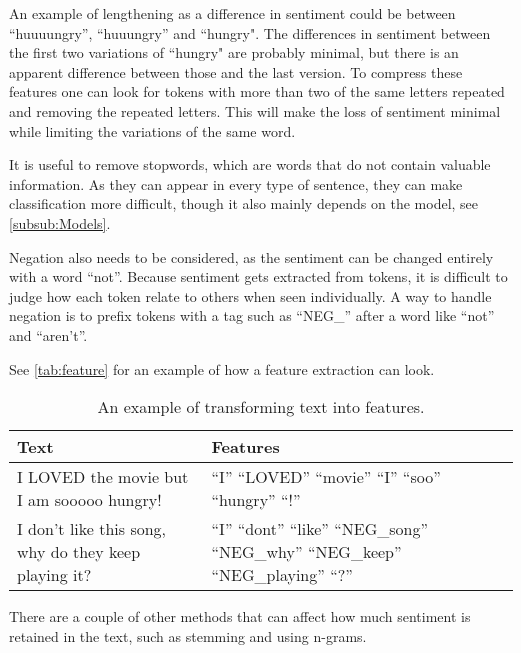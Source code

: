 An example of lengthening as a difference in sentiment could be between
``huuuungry'', ``huuungry'' and ``hungry". The differences in sentiment between
the first two variations of ``hungry" are probably minimal, but there is an
apparent difference between those and the last version. To compress these
features one can look for tokens with more than two of the same letters repeated
and removing the repeated letters. This will make the loss of sentiment minimal
while limiting the variations of the same word.\nl

It is useful to remove stopwords, which are words that do not contain valuable
information. As they can appear in every type of sentence, they can make
classification more difficult, though it also mainly depends on the model,
see \autoref{subsub:Models}.\nl

Negation also needs to be considered, as the sentiment can be changed entirely
with a word ``not''. Because sentiment gets extracted from tokens, it is
difficult to judge how each token relate to others when seen individually. A way
to handle negation is to prefix tokens with a tag such as ``NEG\_'' after a word
like ``not'' and ``aren't''.\nl

See \autoref{tab:feature} for an example of how a feature extraction can look.

\begin{table}[H]
\centering
\begin{tabular}{|p{6cm}|p{8cm}|}
\hline
Text & Features \\ \hline
I LOVED the movie but I am sooooo hungry! & 
``I'' ``LOVED'' ``movie'' ``I'' ``soo'' ``hungry'' ``!''
\\ \hline 
I don't like this song, why do they keep playing it? &
``I'' ``dont'' ``like'' ``NEG\_song'' ``NEG\_why'' ``NEG\_keep'' ``NEG\_playing''
``?'' \\ \hline
\end{tabular}
\caption{An example of transforming text into features.}
\label{tab:feature}
\end{table}

There are a couple of other methods that can affect how much sentiment is
retained in the text, such as stemming and using n-grams.


